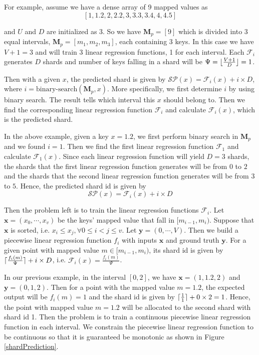 \begin{mscexample}
	For example, assume we have a dense array of 9 mapped values as $$[1,1.2,2, 2.2,3,3.3,3.4,4, 4.5]$$
	
and $U$ and $D$ are initialized as 3. So we have $\boldsymbol{M}_p=[9]$ which is divided into 3 equal intervals, $\boldsymbol{M}_p=[m_1, m_2, m_3]$, each containing 3 keys. In this case we have $V+1 = 3$ and will train $3$ linear regression functions, 1 for each interval. Each $\mathcal{F}_i$ generates $D$ shards and number of keys falling in a shard will be $\Psi= \lfloor\frac{V+1}{D}\rfloor = 1$.
\end{mscexample}


Then with a given $x$, the predicted shard is given by $\mathcal{SP}(x)=\mathcal{F}_i(x)+i\times D$, where $i=\text{binary-search}(\boldsymbol{M}_p,x)$. More specifically, we first determine $i$ by using binary search. The result tells which interval this $x$ should belong to. Then we find the corresponding linear regression function $\mathcal{F}_i$ and calculate $\mathcal{F}_i(x)$, which is the predicted shard.

\begin{mscexample}
	In the above example, given a key $x=1.2$, we first perform binary search in $\boldsymbol{M}_p$ and we found $i=1$. Then we find the first linear regression function $\mathcal{F}_1$ and calculate $\mathcal{F}_1(x)$. Since each linear regression function will yield $D=3$ shards, the shards that the first linear regression function generates will be from $0$ to $2$ and the shards that the second linear regression function generates will be from $3$ to $5$. Hence, the predicted shard id is given by 
$$
\mathcal{SP}(x)=\mathcal{F}_i(x)+i\times D
$$
\end{mscexample}

Then the problem left is to train the linear regression functions $\mathcal{F}_i$. Let $\boldsymbol{x}=(x_0,\cdots,x_v)$ be the keys' mapped value that fall in $[m_{i-1}, m_i)$. Suppose that $\boldsymbol{x}$ is sorted, i.e. $x_i\leq x_j, \forall 0\leq i<j\leq v$. Let $\boldsymbol{y}=(0,\cdots, V)$. Then we build a piecewise linear regression function $f_i$ with inputs $\boldsymbol{x}$ and ground truth $\boldsymbol{y}$. For a given point with mapped value $m\in[m_{i-1}, m_i)$, its shard id is given by $\lceil\frac{f_i(m)}{\Psi}\rceil+i\times D$, i.e. $\mathcal{F}_i(x)=\frac{f_i(m)}{\Psi}$.

\begin{mscexample}
	In our previous example, in the interval $[0,2]$, we have $\boldsymbol{x}=(1,1.2,2)$ and $\boldsymbol{y}=(0,1,2)$. Then for a point with the mapped value $m=1.2$, the expected output will be $f_i(m)=1$ and the shard id is given by $\lceil\frac{1}{1}\rceil+0\times 2=1$. Hence, the point with mapped value $m=1.2$ will be allocated to the second shard with shard id 1. Then the problem is to train a continuous piecewise linear regression function in each interval. We constrain the piecewise linear regression function to be continuous so that it is guaranteed be monotonic as shown in Figure \ref{shardPrediction}.
\end{mscexample}

